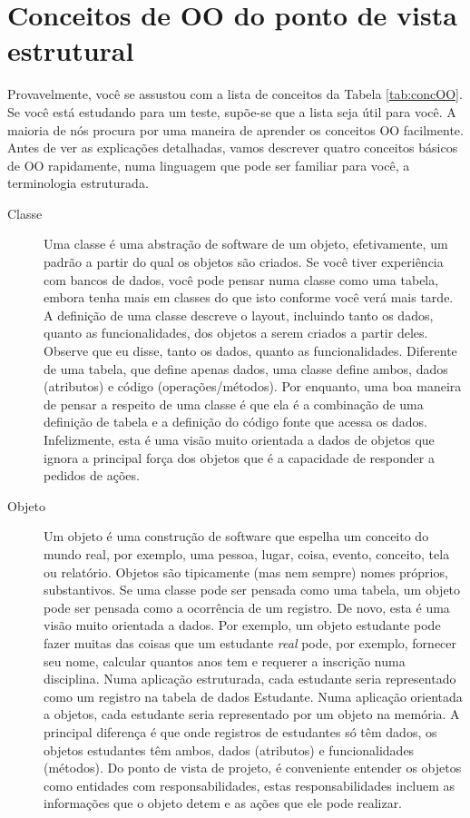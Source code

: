 \section{Conceitos de OO do ponto de vista estrutural}

Provavelmente, você se assustou com a lista de conceitos da Tabela \ref{tab:concOO}. Se você está estudando para um teste, supõe-se que a lista seja útil para você. A maioria de nós procura por uma maneira de aprender os conceitos OO facilmente. Antes de ver as explicações detalhadas, vamos descrever quatro conceitos básicos de OO rapidamente, numa linguagem que pode ser familiar para você, a terminologia estruturada.

\begin{description}
\item[Classe] Uma classe é uma abstração de software de um objeto, efetivamente, um padrão a partir do qual os objetos são criados. Se você tiver experiência com bancos de dados, você pode pensar numa classe como uma tabela, embora tenha mais em classes do que isto conforme você verá mais tarde. A definição de uma classe descreve o layout, incluindo tanto os dados, quanto as funcionalidades, dos objetos a serem criados a partir deles. Observe que eu disse, tanto os dados, quanto as funcionalidades. Diferente de uma tabela, que define apenas dados, uma classe define ambos, dados (atributos) e código (operações/métodos). Por enquanto, uma boa maneira de pensar a respeito de uma classe é que ela é a combinação de uma definição de tabela e a definição do código fonte que acessa os dados. Infelizmente, esta é uma visão muito orientada a dados de objetos que ignora a principal força dos objetos que é a capacidade de responder a pedidos de ações.

\item[Objeto] Um objeto é uma construção de software que espelha um conceito do mundo real, por exemplo, uma pessoa, lugar, coisa, evento, conceito, tela ou relatório. Objetos são tipicamente (mas nem sempre) nomes próprios, substantivos. Se uma classe pode ser pensada como uma tabela, um objeto pode ser pensada como a ocorrência de um registro. De novo, esta é uma visão muito orientada a dados. Por exemplo, um objeto estudante pode fazer muitas das coisas que um estudante \emph{real} pode, por exemplo, fornecer seu nome, calcular quantos anos tem e requerer a inscrição numa disciplina. Numa aplicação estruturada, cada estudante seria representado como um registro na tabela de dados Estudante. Numa aplicação orientada a objetos, cada estudante seria representado por um objeto na memória. A principal diferença é que onde registros de estudantes só têm dados, os objetos estudantes têm ambos, dados (atributos) e funcionalidades (métodos). Do ponto de vista de projeto, é conveniente entender os objetos como entidades com responsabilidades, estas responsabilidades incluem as informações que o objeto detem e as ações que ele pode realizar.


\end{description}
